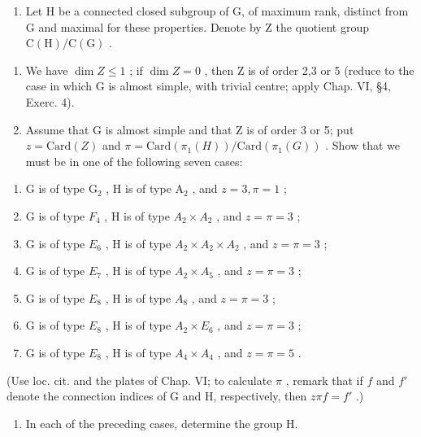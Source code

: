\begin{enumerate}
\def\labelenumi{\arabic{enumi})}
\setcounter{enumi}{8}
\tightlist
\item
  Let H be a connected closed subgroup of G, of maximum rank, distinct from G and maximal for these properties. Denote by Z the quotient group \(\mathrm{C}(\mathrm{H})/\mathrm{C}(\mathrm{G})\) .
\end{enumerate}

\begin{enumerate}
\def\labelenumi{\alph{enumi})}
\item
  We have \(\dim Z \leq 1\) ; if \(\dim Z = 0\) , then Z is of order 2,3 or 5 (reduce to the case in which G is almost simple, with trivial centre; apply Chap. VI, §4, Exerc. 4).
\item
  Assume that G is almost simple and that Z is of order 3 or 5; put \(z = \text{Card}(Z)\) and \(\pi = \text{Card}(\pi_1(H))/\text{Card}(\pi_1(G))\) . Show that we must be in one of the following seven cases:
\end{enumerate}

\begin{enumerate}
\def\labelenumi{(\roman{enumi})}
\item
  G is of type \(\mathrm{G}_2\) , H is of type \(\mathrm{A}_2\) , and \(z = 3, \pi = 1\) ;
\item
  G is of type \(F_{4}\) , H is of type \(A_{2} \times A_{2}\) , and \(z = \pi = 3\) ;
\item
  G is of type \(E_{6}\) , H is of type \(A_{2} \times A_{2} \times A_{2}\) , and \(z = \pi = 3\) ;
\item
  G is of type \(E_{7}\) , H is of type \(A_{2} \times A_{5}\) , and \(z = \pi = 3\) ;
\item
  G is of type \(E_{8}\) , H is of type \(A_{8}\) , and \(z = \pi = 3\) ;
\item
  G is of type \(E_{8}\) , H is of type \(A_{2} \times E_{6}\) , and \(z = \pi = 3\) ;
\item
  G is of type \(E_{8}\) , H is of type \(A_{4} \times A_{4}\) , and \(z = \pi = 5\) .
\end{enumerate}

(Use loc. cit. and the plates of Chap. VI; to calculate \(\pi\) , remark that if \(f\) and \(f'\) denote the connection indices of G and H, respectively, then \(z\pi f = f'\) .)

\begin{enumerate}
\def\labelenumi{\alph{enumi})}
\setcounter{enumi}{2}
\tightlist
\item
  In each of the preceding cases, determine the group H.
\end{enumerate}

